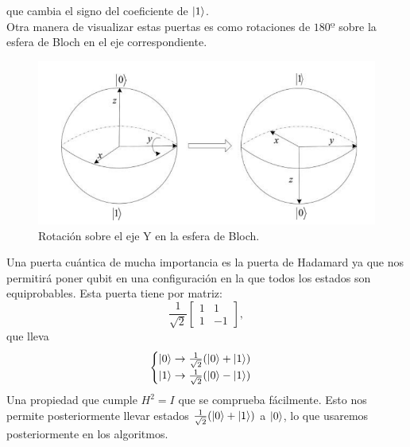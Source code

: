 \documentclass[a4paper]{article}
\numberwithin{equation}{section}
\begin{document}
que cambia el signo del coeficiente de $\ket{1}$.\\
Otra manera de visualizar estas puertas es como rotaciones de $180º$ sobre la esfera de Bloch en el eje correspondiente. \\
\begin{figure}[h]
	\centering
	\includegraphics[scale=.65]{rotacion_bloch}
	\caption{Rotación sobre el eje Y en la esfera de Bloch.}
\end{figure}

Una puerta cuántica de mucha importancia es la puerta de Hadamard ya que nos permitirá poner qubit en una configuración en la que todos los estados son equiprobables. Esta puerta tiene por matriz:
\begin{equation}
\frac{1}{\sqrt{2}}
\begin{bmatrix}
1 & 1 \\
1 & -1
\end{bmatrix},
\end{equation}
que lleva
\begin{equation}
\begin{cases}
\ket{0} \rightarrow \frac{1}{\sqrt{2}}(\ket{0} + \ket{1}) \\
\ket{1} \rightarrow \frac{1}{\sqrt{2}}(\ket{0} - \ket{1})
\end{cases}
\end{equation}
Una propiedad que cumple $H^2 = I$ que se comprueba fácilmente. Esto nos permite posteriormente llevar estados $\frac{1}{\sqrt{2}}(\ket{0} + \ket{1})$ a $\ket{0}$, lo que usaremos posteriormente en los algoritmos.
\end{document}
